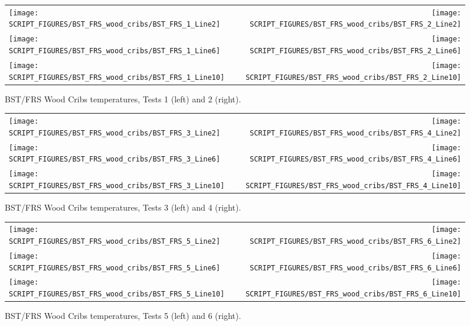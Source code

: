 \begin{figure}[!h]
\begin{tabular*}{\textwidth}{l@{\extracolsep{\fill}}r}
\texttt{[image: SCRIPT\_FIGURES/BST\_FRS\_wood\_cribs/BST\_FRS\_1\_Line2]} &
\texttt{[image: SCRIPT\_FIGURES/BST\_FRS\_wood\_cribs/BST\_FRS\_2\_Line2]} \\
\texttt{[image: SCRIPT\_FIGURES/BST\_FRS\_wood\_cribs/BST\_FRS\_1\_Line6]} &
\texttt{[image: SCRIPT\_FIGURES/BST\_FRS\_wood\_cribs/BST\_FRS\_2\_Line6]} \\
\texttt{[image: SCRIPT\_FIGURES/BST\_FRS\_wood\_cribs/BST\_FRS\_1\_Line10]} &   
\texttt{[image: SCRIPT\_FIGURES/BST\_FRS\_wood\_cribs/BST\_FRS\_2\_Line10]}
\end{tabular*}
\caption[BST/FRS Wood Cribs temperatures, Tests 1 and 2]{BST/FRS Wood Cribs temperatures, Tests 1 (left) and 2 (right).}
\label{BST_FRS_wood_cribs_Tests_1to2}
\end{figure}

\begin{figure}[p]
\begin{tabular*}{\textwidth}{l@{\extracolsep{\fill}}r}
\texttt{[image: SCRIPT\_FIGURES/BST\_FRS\_wood\_cribs/BST\_FRS\_3\_Line2]} &
\texttt{[image: SCRIPT\_FIGURES/BST\_FRS\_wood\_cribs/BST\_FRS\_4\_Line2]} \\
\texttt{[image: SCRIPT\_FIGURES/BST\_FRS\_wood\_cribs/BST\_FRS\_3\_Line6]} & 
\texttt{[image: SCRIPT\_FIGURES/BST\_FRS\_wood\_cribs/BST\_FRS\_4\_Line6]} \\
\texttt{[image: SCRIPT\_FIGURES/BST\_FRS\_wood\_cribs/BST\_FRS\_3\_Line10]} &
\texttt{[image: SCRIPT\_FIGURES/BST\_FRS\_wood\_cribs/BST\_FRS\_4\_Line10]}    
\end{tabular*}
\caption[BST/FRS Wood Cribs temperatures, Tests 3 and 4]{BST/FRS Wood Cribs temperatures, Tests 3 (left) and 4 (right).}
\label{BST_FRS_wood_cribs_Tests_3to4}
\end{figure}

\begin{figure}[p]
\begin{tabular*}{\textwidth}{l@{\extracolsep{\fill}}r}
\texttt{[image: SCRIPT\_FIGURES/BST\_FRS\_wood\_cribs/BST\_FRS\_5\_Line2]} &
\texttt{[image: SCRIPT\_FIGURES/BST\_FRS\_wood\_cribs/BST\_FRS\_6\_Line2]} \\
\texttt{[image: SCRIPT\_FIGURES/BST\_FRS\_wood\_cribs/BST\_FRS\_5\_Line6]} &
\texttt{[image: SCRIPT\_FIGURES/BST\_FRS\_wood\_cribs/BST\_FRS\_6\_Line6]} \\
\texttt{[image: SCRIPT\_FIGURES/BST\_FRS\_wood\_cribs/BST\_FRS\_5\_Line10]} &
\texttt{[image: SCRIPT\_FIGURES/BST\_FRS\_wood\_cribs/BST\_FRS\_6\_Line10]}
\end{tabular*}
\caption[BST/FRS Wood Cribs temperatures, Tests 5 and 6]{BST/FRS Wood Cribs temperatures, Tests 5 (left) and 6 (right).}
\label{BST_FRS_wood_cribs_Tests_5to6}
\end{figure}

